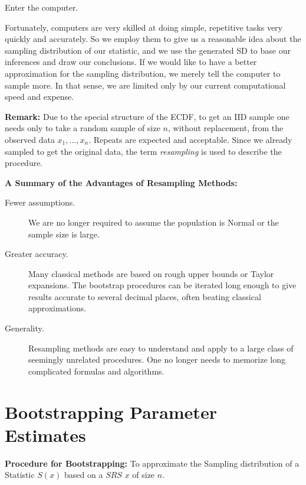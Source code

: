 \documentclass[captions=tableheading]{scrbook}
\begin{document}
\begin{center}
Enter the computer. 
\end{center}

Fortunately, computers are very skilled at doing simple, repetitive tasks very quickly and accurately. So we employ them to give us a reasonable idea about the sampling distribution of our statistic, and we use the generated SD to base our inferences and draw our conclusions. If we would like to have a better approximation for the sampling distribution, we merely tell the computer to sample more. In that sense, we are limited only by our current computational speed and expense.

\textbf{Remark:} Due to the special structure of the ECDF, to get an IID sample one needs only to take a random sample of size $n$, without replacement, from the observed data $x_{1},\ldots,x_{n}$. Repeats are expected and acceptable. Since we already sampled to get the original data, the term \emph{resampling} is used to describe the procedure.

\textbf{A Summary of the Advantages of Resampling Methods:}


\begin{description}
\item[Fewer assumptions.] We are no longer required to assume the population is Normal or the sample size is large.
\item[Greater accuracy.] Many classical methods are based on rough upper bounds or Taylor expansions. The bootstrap procedures can be iterated long enough to give results accurate to several decimal places, often beating classical approximations.
\item[Generality.] Resampling methods are easy to understand and apply to a large class of seemingly unrelated procedures. One no longer needs to memorize long complicated formulas and algorithms.
\end{description}
\section{Bootstrapping Parameter Estimates}
\label{sec-5_3}


\textbf{Procedure for Bootstrapping:} To approximate the Sampling distribution of a Statistic $S(x)$ based on a $SRS$ $x$ of size $n$.
\end{document}
